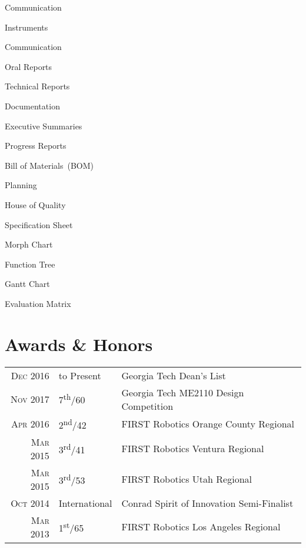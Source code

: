 \documentclass{resume}
\begin{document}
\begin{skills}{Communication}
\begin{groupitem}{Instruments}
  \end{groupitem}
  \begin{groupitem}{Communication}
    \item Oral Reports
    \item Technical Reports
    \item Documentation
    \item Executive Summaries
    \item Progress Reports
    \item Bill of Materials~(BOM)
  \end{groupitem}
  \begin{groupitem}{Planning}
    \item House of Quality
    \item Specification Sheet
    \item Morph Chart
    \item Function Tree
    \item Gantt Chart
    \item Evaluation Matrix
  \end{groupitem}
\end{skills}

\section{Awards \& Honors}
\begin{tabular}{rll}
  \textsc{Dec} 2016 & to Present & Georgia Tech Dean's List\\
  \textsc{Nov} 2017 & 7\textsuperscript{th}/60 & Georgia Tech ME2110 Design Competition\\
  \textsc{Apr} 2016 & 2\textsuperscript{nd}/42 & FIRST Robotics Orange County Regional\\
  \textsc{Mar} 2015 & 3\textsuperscript{rd}/41 & FIRST Robotics Ventura Regional\\
  \textsc{Mar} 2015 & 3\textsuperscript{rd}/53 & FIRST Robotics Utah Regional\\
  \textsc{Oct} 2014 & International & Conrad Spirit of Innovation Semi-Finalist\\
  \textsc{Mar} 2013 & 1\textsuperscript{st}/65 & FIRST Robotics Los Angeles Regional\\
\end{tabular}
\end{document}
